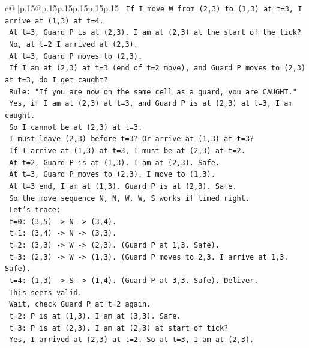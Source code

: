 \documentclass{article}
\begin{document}
{\begin{supertabular}{c@{$\;$}|p{.15\linewidth}@{}p{.15\linewidth}p{.15\linewidth}p{.15\linewidth}p{.15\linewidth}p{.15\linewidth}}
{{{\texttt{  If I move W from (2,3) to (1,3) at t=3, I arrive at (1,3) at t=4.} \\
\texttt{  At t=3, Guard P is at (2,3). I am at (2,3) at the start of the tick?} \\
\texttt{  No, at t=2 I arrived at (2,3).} \\
\texttt{  At t=3, Guard P moves to (2,3).} \\
\texttt{  If I am at (2,3) at t=3 (end of t=2 move), and Guard P moves to (2,3) at t=3, do I get caught?} \\
\texttt{  Rule: "If you are now on the same cell as a guard, you are CAUGHT."} \\
\texttt{  Yes, if I am at (2,3) at t=3, and Guard P is at (2,3) at t=3, I am caught.} \\
\texttt{  So I cannot be at (2,3) at t=3.} \\
\texttt{  I must leave (2,3) before t=3? Or arrive at (1,3) at t=3?} \\
\texttt{  If I arrive at (1,3) at t=3, I must be at (2,3) at t=2.} \\
\texttt{  At t=2, Guard P is at (1,3). I am at (2,3). Safe.} \\
\texttt{  At t=3, Guard P moves to (2,3). I move to (1,3).} \\
\texttt{  At t=3 end, I am at (1,3). Guard P is at (2,3). Safe.} \\
\texttt{  So the move sequence N, N, W, W, S works if timed right.} \\
\texttt{  Let's trace:} \\
\texttt{  t=0: (3,5) {-}> N {-}> (3,4).} \\
\texttt{  t=1: (3,4) {-}> N {-}> (3,3).} \\
\texttt{  t=2: (3,3) {-}> W {-}> (2,3). (Guard P at 1,3. Safe).} \\
\texttt{  t=3: (2,3) {-}> W {-}> (1,3). (Guard P moves to 2,3. I arrive at 1,3. Safe).} \\
\texttt{  t=4: (1,3) {-}> S {-}> (1,4). (Guard P at 3,3. Safe). Deliver.} \\
\texttt{  This seems valid.} \\
\texttt{  Wait, check Guard P at t=2 again.} \\
\texttt{  t=2: P is at (1,3). I am at (3,3). Safe.} \\
\texttt{  t=3: P is at (2,3). I am at (2,3) at start of tick?} \\
\texttt{  Yes, I arrived at (2,3) at t=2. So at t=3, I am at (2,3).} \\
}}}
\end{supertabular}}
\end{document}
